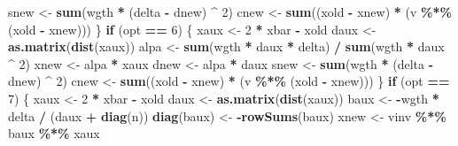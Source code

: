 \documentclass[
  12pt,
]{article}
\newenvironment{Shaded}{\begin{snugshade}}{\end{snugshade}}
\newcommand{\ControlFlowTok}[1]{\textcolor[rgb]{0.13,0.29,0.53}{\textbf{#1}}}
\newcommand{\DecValTok}[1]{\textcolor[rgb]{0.00,0.00,0.81}{#1}}
\newcommand{\FunctionTok}[1]{\textcolor[rgb]{0.13,0.29,0.53}{\textbf{#1}}}
\newcommand{\NormalTok}[1]{#1}
\newcommand{\OtherTok}[1]{\textcolor[rgb]{0.56,0.35,0.01}{#1}}
\newcommand{\SpecialCharTok}[1]{\textcolor[rgb]{0.81,0.36,0.00}{\textbf{#1}}}
\begin{document}
\begin{Shaded}
\begin{Highlighting}[]
\NormalTok{      snew }\OtherTok{\textless{}{-}} \FunctionTok{sum}\NormalTok{(wgth }\SpecialCharTok{*}\NormalTok{ (delta }\SpecialCharTok{{-}}\NormalTok{ dnew) }\SpecialCharTok{\^{}} \DecValTok{2}\NormalTok{)}
\NormalTok{      cnew }\OtherTok{\textless{}{-}} \FunctionTok{sum}\NormalTok{((xold }\SpecialCharTok{{-}}\NormalTok{ xnew) }\SpecialCharTok{*}\NormalTok{ (v }\SpecialCharTok{\%*\%}\NormalTok{ (xold }\SpecialCharTok{{-}}\NormalTok{ xnew)))}
\NormalTok{    \}}
    \ControlFlowTok{if}\NormalTok{ (opt }\SpecialCharTok{==} \DecValTok{6}\NormalTok{) \{}
\NormalTok{      xaux }\OtherTok{\textless{}{-}} \DecValTok{2} \SpecialCharTok{*}\NormalTok{ xbar }\SpecialCharTok{{-}}\NormalTok{ xold}
\NormalTok{      daux }\OtherTok{\textless{}{-}} \FunctionTok{as.matrix}\NormalTok{(}\FunctionTok{dist}\NormalTok{(xaux))}
\NormalTok{      alpa }\OtherTok{\textless{}{-}} \FunctionTok{sum}\NormalTok{(wgth }\SpecialCharTok{*}\NormalTok{ daux }\SpecialCharTok{*}\NormalTok{ delta) }\SpecialCharTok{/} \FunctionTok{sum}\NormalTok{(wgth }\SpecialCharTok{*}\NormalTok{ daux }\SpecialCharTok{\^{}} \DecValTok{2}\NormalTok{)}
\NormalTok{      xnew }\OtherTok{\textless{}{-}}\NormalTok{ alpa }\SpecialCharTok{*}\NormalTok{ xaux}
\NormalTok{      dnew }\OtherTok{\textless{}{-}}\NormalTok{ alpa }\SpecialCharTok{*}\NormalTok{ daux}
\NormalTok{      snew }\OtherTok{\textless{}{-}} \FunctionTok{sum}\NormalTok{(wgth }\SpecialCharTok{*}\NormalTok{ (delta }\SpecialCharTok{{-}}\NormalTok{ dnew) }\SpecialCharTok{\^{}} \DecValTok{2}\NormalTok{)}
\NormalTok{      cnew }\OtherTok{\textless{}{-}} \FunctionTok{sum}\NormalTok{((xold }\SpecialCharTok{{-}}\NormalTok{ xnew) }\SpecialCharTok{*}\NormalTok{ (v }\SpecialCharTok{\%*\%}\NormalTok{ (xold }\SpecialCharTok{{-}}\NormalTok{ xnew)))}
\NormalTok{    \}}
    \ControlFlowTok{if}\NormalTok{ (opt }\SpecialCharTok{==} \DecValTok{7}\NormalTok{) \{}
\NormalTok{      xaux }\OtherTok{\textless{}{-}} \DecValTok{2} \SpecialCharTok{*}\NormalTok{ xbar }\SpecialCharTok{{-}}\NormalTok{ xold}
\NormalTok{      daux }\OtherTok{\textless{}{-}} \FunctionTok{as.matrix}\NormalTok{(}\FunctionTok{dist}\NormalTok{(xaux))}
\NormalTok{      baux }\OtherTok{\textless{}{-}} \SpecialCharTok{{-}}\NormalTok{wgth }\SpecialCharTok{*}\NormalTok{ delta }\SpecialCharTok{/}\NormalTok{ (daux }\SpecialCharTok{+} \FunctionTok{diag}\NormalTok{(n))}
      \FunctionTok{diag}\NormalTok{(baux) }\OtherTok{\textless{}{-}} \SpecialCharTok{{-}}\FunctionTok{rowSums}\NormalTok{(baux)}
\NormalTok{      xnew }\OtherTok{\textless{}{-}}\NormalTok{ vinv }\SpecialCharTok{\%*\%}\NormalTok{ baux }\SpecialCharTok{\%*\%}\NormalTok{ xaux}

\end{Highlighting}
\end{Shaded}
\end{document}
